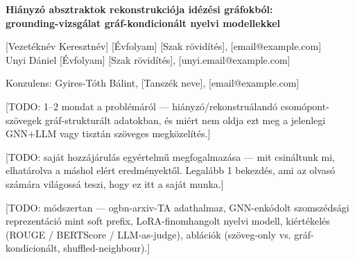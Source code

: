 \documentclass[12pt]{article}
\begin{document}
\begin{center}
    {\Large\bfseries Hiányzó absztraktok rekonstrukciója idézési gráfokból: \\
    grounding-vizsgálat gráf-kondicionált nyelvi modellekkel}
\end{center}

\vspace{0.8em}

\begin{center}
    [Vezetéknév Keresztnév] [Évfolyam] [Szak rövidítés], [email@example.com] \\
    Unyi Dániel [Évfolyam] [Szak rövidítés], [unyi.email@example.com]
\end{center}

\vspace{0.4em}

\begin{center}
    Konzulens: Gyires-Tóth Bálint, [Tanszék neve], [email@example.com]
\end{center}

\vspace{1.2em}


[TODO: 1--2 mondat a problémáról — hiányzó/rekonstruálandó
csomópont-szövegek gráf-strukturált adatokban, és miért nem oldja
ezt meg a jelenlegi GNN+LLM vagy tisztán szöveges megközelítés.]

[TODO: saját hozzájárulás egyértelmű megfogalmazása — mit csináltunk
mi, elhatárolva a máshol elért eredményektől. Legalább 1 bekezdés,
ami az olvasó számára világossá teszi, hogy ez itt a saját munka.]

[TODO: módszertan — ogbn-arxiv-TA adathalmaz, GNN-enkódolt szomszédsági
reprezentáció mint soft prefix, LoRA-finomhangolt nyelvi modell,
kiértékelés (ROUGE / BERTScore / LLM-as-judge), ablációk (szöveg-only
vs. gráf-kondicionált, shuffled-neighbour).]
\end{document}
